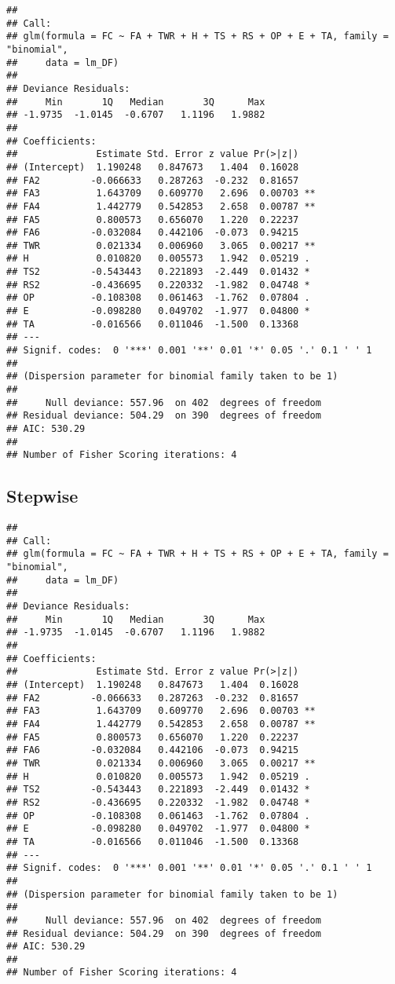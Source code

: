 \documentclass[]{article}
\begin{document}
\begin{verbatim}
## 
## Call:
## glm(formula = FC ~ FA + TWR + H + TS + RS + OP + E + TA, family = "binomial", 
##     data = lm_DF)
## 
## Deviance Residuals: 
##     Min       1Q   Median       3Q      Max  
## -1.9735  -1.0145  -0.6707   1.1196   1.9882  
## 
## Coefficients:
##              Estimate Std. Error z value Pr(>|z|)   
## (Intercept)  1.190248   0.847673   1.404  0.16028   
## FA2         -0.066633   0.287263  -0.232  0.81657   
## FA3          1.643709   0.609770   2.696  0.00703 **
## FA4          1.442779   0.542853   2.658  0.00787 **
## FA5          0.800573   0.656070   1.220  0.22237   
## FA6         -0.032084   0.442106  -0.073  0.94215   
## TWR          0.021334   0.006960   3.065  0.00217 **
## H            0.010820   0.005573   1.942  0.05219 . 
## TS2         -0.543443   0.221893  -2.449  0.01432 * 
## RS2         -0.436695   0.220332  -1.982  0.04748 * 
## OP          -0.108308   0.061463  -1.762  0.07804 . 
## E           -0.098280   0.049702  -1.977  0.04800 * 
## TA          -0.016566   0.011046  -1.500  0.13368   
## ---
## Signif. codes:  0 '***' 0.001 '**' 0.01 '*' 0.05 '.' 0.1 ' ' 1
## 
## (Dispersion parameter for binomial family taken to be 1)
## 
##     Null deviance: 557.96  on 402  degrees of freedom
## Residual deviance: 504.29  on 390  degrees of freedom
## AIC: 530.29
## 
## Number of Fisher Scoring iterations: 4
\end{verbatim}

\hypertarget{stepwise-1}{%
\subsection{Stepwise}\label{stepwise-1}}

\begin{verbatim}
## 
## Call:
## glm(formula = FC ~ FA + TWR + H + TS + RS + OP + E + TA, family = "binomial", 
##     data = lm_DF)
## 
## Deviance Residuals: 
##     Min       1Q   Median       3Q      Max  
## -1.9735  -1.0145  -0.6707   1.1196   1.9882  
## 
## Coefficients:
##              Estimate Std. Error z value Pr(>|z|)   
## (Intercept)  1.190248   0.847673   1.404  0.16028   
## FA2         -0.066633   0.287263  -0.232  0.81657   
## FA3          1.643709   0.609770   2.696  0.00703 **
## FA4          1.442779   0.542853   2.658  0.00787 **
## FA5          0.800573   0.656070   1.220  0.22237   
## FA6         -0.032084   0.442106  -0.073  0.94215   
## TWR          0.021334   0.006960   3.065  0.00217 **
## H            0.010820   0.005573   1.942  0.05219 . 
## TS2         -0.543443   0.221893  -2.449  0.01432 * 
## RS2         -0.436695   0.220332  -1.982  0.04748 * 
## OP          -0.108308   0.061463  -1.762  0.07804 . 
## E           -0.098280   0.049702  -1.977  0.04800 * 
## TA          -0.016566   0.011046  -1.500  0.13368   
## ---
## Signif. codes:  0 '***' 0.001 '**' 0.01 '*' 0.05 '.' 0.1 ' ' 1
## 
## (Dispersion parameter for binomial family taken to be 1)
## 
##     Null deviance: 557.96  on 402  degrees of freedom
## Residual deviance: 504.29  on 390  degrees of freedom
## AIC: 530.29
## 
## Number of Fisher Scoring iterations: 4
\end{verbatim}
\end{document}
